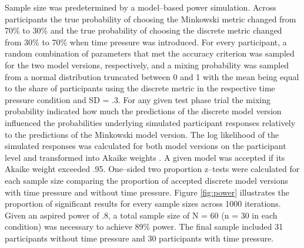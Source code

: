 \documentclass[a4paper,man,natbib]{apa6}
\begin{document}
Sample size was predetermined by a model--based power simulation. Across participants the true probability of choosing the Minkowski metric changed from 70\% to 30\% and the true probability of choosing the discrete metric changed from 30\% to 70\% when time pressure was introduced. For every participant, a random combination of parameters that met the accuracy criterion was sampled for the two model versions, respectively, and a mixing probability was sampled from a normal distribution truncated between 0 and 1 with the mean being equal to the share of participants using the discrete metric in the respective time pressure condition and SD =  .3. For any given test phase trial the mixing probability indicated how much the predictions of the discrete model version influenced the probabilities underlying simulated participant responses relatively to the predictions of the Minkowski model version. The log likelihood of the simulated responses was calculated for both model versions on the participant level and transformed into Akaike weights \citep{wagenmakers2004aic}. A given model was accepted if its Akaike weight exceeded .95. One--sided two proportion z--tests were calculated for each sample size comparing the proportion of accepted discrete model versions with time pressure and without time pressure. Figure \ref{fig:power} illustrates the proportion of significant results for every sample sizes across 1000 iterations. Given an aspired power of .8, a total sample size of N = 60 (n = 30 in each condition) was necessary to achieve 89\% power. The final sample included 31 participants without time pressure and 30 participants with time pressure.
\end{document}
